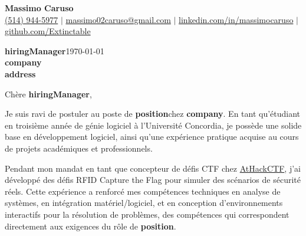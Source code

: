 \documentclass[10pt]{article}
\begin{document}
\newcommand{\fullname}{Massimo Caruso}
\newcommand{\phone}{(514) 944-5977}
\newcommand{\email}{massimo02caruso@gmail.com}
\newcommand{\linkedin}{linkedin.com/in/massimocaruso}
\newcommand{\github}{github.com/Extinctable}

\newcommand*{\hiringManager}{\textbf{hiringManager}}
\newcommand*{\company}{\textbf{company}}
\newcommand*{\address}{\textbf{address}}

\newcommand*{\position}{\textbf{position}}
\newcommand*{\companyDetails}{\textbf{companyDetails}}
\newcommand*{\positionDetails}{\textbf{positionDetails}}

\begin{center}
    {\Huge \textbf{\fullname}} \\
    \vspace{1mm}
    {\small 
    \faPhone \hspace{0mm} \href{tel:+15149445977}{\phone} $\vert$ 
    \faEnvelope \hspace{0mm} \href{mailto:massimo02caruso@gmail.com}{\email} $\vert$ 
    \faLinkedin \hspace{0mm} \href{https://linkedin.com/in/massimocaruso}{\linkedin} $\vert$ 
    \faGithub \hspace{0mm} \href{https://github.com/Extinctable}{\github}
    }
\end{center}

\vspace{1.5em}
\hiringManager \hfill \today \\
\company \\
\address

\vspace{1.5em}
Chère \hiringManager,

Je suis ravi de postuler au poste de \position \space chez \company. En tant qu'étudiant en troisième année de génie logiciel à l'Université Concordia, je possède une solide base en développement logiciel, ainsi qu'une expérience pratique acquise au cours de projets académiques et professionnels.

Pendant mon mandat en tant que concepteur de défis CTF chez \href{https://www.athackctf.com}{AtHackCTF}, j'ai développé des défis RFID Capture the Flag pour simuler des scénarios de sécurité réels. Cette expérience a renforcé mes compétences techniques en analyse de systèmes, en intégration matériel/logiciel, et en conception d'environnements interactifs pour la résolution de problèmes, des compétences qui correspondent directement aux exigences du rôle de \position.
\end{document}
